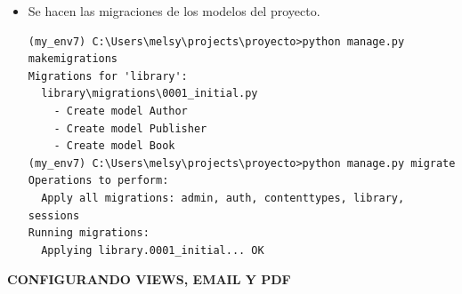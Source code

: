 \documentclass{article}
\begin{document}
\begin{itemize}
\item Se hacen las migraciones de los modelos del proyecto.

\begin{lstlisting}[style=shell]
(my_env7) C:\Users\melsy\projects\proyecto>python manage.py makemigrations
Migrations for 'library':
  library\migrations\0001_initial.py
    - Create model Author
    - Create model Publisher
    - Create model Book
(my_env7) C:\Users\melsy\projects\proyecto>python manage.py migrate
Operations to perform:
  Apply all migrations: admin, auth, contenttypes, library, sessions
Running migrations:
  Applying library.0001_initial... OK
\end{lstlisting}

\end{itemize}

\vspace{2\baselineskip}

\textbf{CONFIGURANDO VIEWS, EMAIL Y PDF}

\vspace{\baselineskip}
\end{document}
